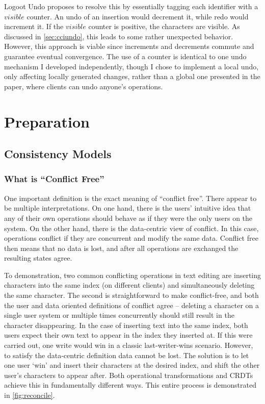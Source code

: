 \documentclass[12pt,a4paper,twoside,openright]{report}
\begin{document}
Logoot Undo \cite{weiss2010undo} proposes to resolve this by essentially tagging each identifier with a $visible$ counter. An undo of an insertion would decrement it, while redo would increment it. If the $visible$ counter is positive, the characters are visible. As discussed in \cref{sec:cciundo}, this leads to some rather unexpected behavior. However, this approach is viable since increments and decrements commute and guarantee eventual convergence. The use of a counter is identical to one undo mechanism I developed independently, though I chose to implement a local undo, only affecting locally generated changes, rather than a global one presented in the paper, where clients can undo anyone's operations.


\chapter{Preparation}


\section{Consistency Models}

	\subsection{What is ``Conflict Free''}
	
	One important definition is the exact meaning of ``conflict free''. There appear to be multiple interpretations. On one hand, there is the users' intuitive idea that any of their own operations should behave as if they were the only users on the system. On the other hand, there is the data-centric view of conflict. In this case, operations conflict if they are concurrent and modify the same data. Conflict free then means that no data is lost, and after all operations are exchanged the resulting states agree.
	
	To demonstration, two common conflicting operations in text editing are inserting characters into the same index (on different clients) and simultaneously deleting the same character. The second is straightforward to make conflict-free, and both the user and data oriented definitions of conflict agree -- deleting a character on a single user system or multiple times concurrently should still result in the character disappearing. In the case of inserting text into the same index, both users expect their own text to appear in the index they inserted at. If this were carried out, one write would win in a classic last-writer-wins scenario. However, to satisfy the data-centric definition data cannot be lost. The solution is to let one user `win' and insert their characters at the desired index, and shift the other user's characters to appear after. Both operational transformations and CRDTs achieve this in fundamentally different ways. This entire process is demonstrated in \ref{fig:reconcile}.
	
\end{document}
